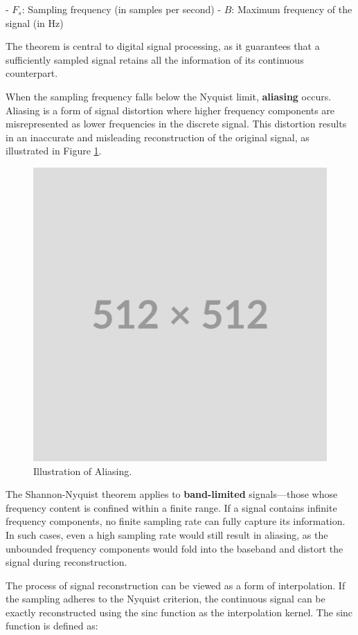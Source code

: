 - \( F_s \): Sampling frequency (in samples per second)
- \( B \): Maximum frequency of the signal (in Hz)

The theorem is central to digital signal processing, as it guarantees that a sufficiently sampled signal retains all the information of its continuous counterpart.

When the sampling frequency falls below the Nyquist limit, \textbf{aliasing} occurs. Aliasing is a form of signal distortion where higher frequency components are misrepresented as lower frequencies in the discrete signal. This distortion results in an inaccurate and misleading reconstruction of the original signal, as illustrated in Figure \ref{f:aliasing-example}.

\begin{figure}[!h]
  \centering
  \includegraphics[width=0.85\linewidth]{img/placeholder512.png}
  \caption{Illustration of Aliasing.}
  \label{f:aliasing-example}
\end{figure}

The Shannon-Nyquist theorem applies to \textbf{band-limited} signals—those whose frequency content is confined within a finite range. If a signal contains infinite frequency components, no finite sampling rate can fully capture its information. In such cases, even a high sampling rate would still result in aliasing, as the unbounded frequency components would fold into the baseband and distort the signal during reconstruction.

The process of signal reconstruction can be viewed as a form of interpolation. If the sampling adheres to the Nyquist criterion, the continuous signal can be exactly reconstructed using the sinc function as the interpolation kernel. The sinc function is defined as:

